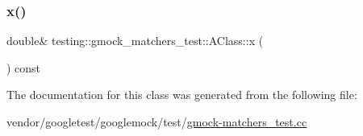 \mbox{\label{classtesting_1_1gmock__matchers__test_1_1_a_class_ade61d438cb535d71d0dcc17a1d5bd7cd}} 
\subsubsection{\texorpdfstring{x()}{x()}}
{\footnotesize\ttfamily double\& testing\+::gmock\+\_\+matchers\+\_\+test\+::\+A\+Class\+::x (\begin{DoxyParamCaption}{ }\end{DoxyParamCaption}) const\hspace{0.3cm}{\ttfamily [inline]}}



The documentation for this class was generated from the following file\+:\begin{DoxyCompactItemize}
\item 
vendor/googletest/googlemock/test/\hyperlink{gmock-matchers__test_8cc}{gmock-\/matchers\+\_\+test.\+cc}\end{DoxyCompactItemize}
